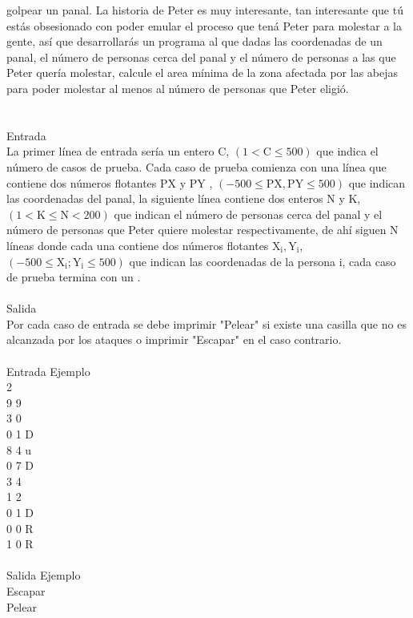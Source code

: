 \documentclass[12pt]{article}
\begin{document}
golpear un panal.
La historia de Peter es muy interesante, tan interesante que t\'u est\'as obsesionado con poder emular el proceso
que ten\'a Peter para molestar a la gente, as\'i que desarrollar\'as un programa al que dadas las coordenadas de un
panal, el n\'umero de personas cerca del panal y el n\'umero de personas a las que Peter quer\'ia molestar, calcule el
area m\'inima de la zona afectada por las abejas para poder molestar al menos al n\'umero de personas que Peter
eligi\'o.\\
\\
\\
\textrm{\large Entrada}
\\La primer l\'inea de entrada ser\'ia un entero $\mathrm{C}$, $\mathrm{(1 < C \leq 500)}$ que indica el n\'umero de casos de prueba. Cada caso de prueba comienza con una l\'inea que contiene dos n\'umeros flotantes $\mathrm{PX}$ y $\mathrm{PY}$ , $\mathrm{(-500 \leq PX, PY \leq 500)}$ que indican las coordenadas del panal, la siguiente l\'inea contiene dos enteros $\mathrm{N}$ y $\mathrm{K}$, $\mathrm{(1 < K \leq N < 200)}$ que
indican el n\'umero de personas cerca del panal y el n\'umero de personas que Peter quiere molestar respectivamente, de ah\'i siguen N l\'ineas donde cada una contiene dos n\'umeros flotantes $\mathrm{X_i, Y_i}$, $\mathrm{(-500 \leq X_i; Y_i \leq 500)}$ que indican
las coordenadas de la persona i, cada caso de prueba termina con un \*.\\
\\
\textrm{\large Salida}
\\Por cada caso de entrada se debe imprimir "Pelear" si existe una casilla que no es alcanzada por los ataques o
imprimir "Escapar" en el caso contrario.\\
\\
\textrm{\large Entrada Ejemplo}
\\2\\
9 9\\
3 0\\
0 1 D\\
8 4 u\\
0 7 D\\
3 4\\
1 2\\
0 1 D\\
0 0 R\\
1 0 R\\
\\
\textrm{\large Salida Ejemplo}
\\Escapar\\
Pelear\\
\\
\end{document}
